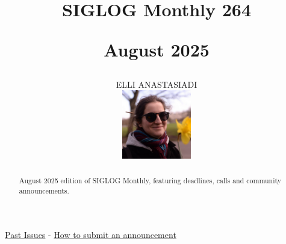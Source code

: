 \documentclass[prodmode,acmtecs]{acmsmall} %
\newcounter{colstart}
\begin{document}
\setcounter{colstart}{\thepage}

\title{{\huge\sc SIGLOG Monthly 264}

 August 2025}\author{ELLI ANASTASIADI\vspace*{-2.6cm}\begin{flushright}\includegraphics[width=30mm]{elli_anastasiadi.png}\end{flushright}}\begin{abstract}August 2025 edition of SIGLOG Monthly, featuring deadlines, calls and community announcements.
\end{abstract}


\maketitlee

\href{https://lics.siglog.org/newsletters/}{Past Issues}
 - 
\href{https://lics.siglog.org/newsletters/inst.html}{How to submit an announcement}
\end{document}
